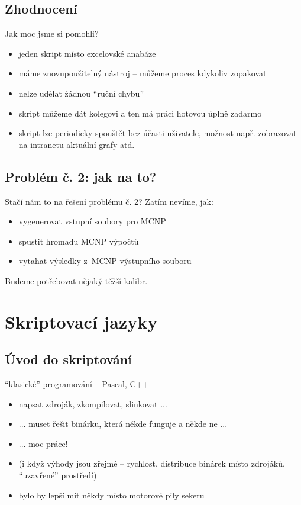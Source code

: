 \documentclass{beamer}
\begin{document}
\subsection{Zhodnocení}

\begin{frame}{Jak moc jsme si pomohli?}
  \begin{itemize}
    \item jeden skript místo excelovské anabáze
    \item máme znovupoužitelný nástroj -- můžeme proces kdykoliv zopakovat
    \item nelze udělat žádnou ``ruční chybu''
    \item skript můžeme dát kolegovi a ten má práci hotovou úplně zadarmo
    \item skript lze periodicky spouštět bez účasti uživatele, možnost např. zobrazovat na intranetu aktuální grafy atd.
  \end{itemize}
\end{frame}

\subsection{Problém č. 2: jak na to?}

\begin{frame}{Stačí nám to na řešení problému č. 2?}
  Zatím nevíme, jak:
  \begin{itemize}
    \item vygenerovat vstupní soubory pro MCNP
    \item spustit hromadu MCNP výpočtů
    \item vytahat výsledky z~MCNP výstupního souboru
  \end{itemize}
  Budeme potřebovat nějaký těžší kalibr.
\end{frame}

\section{Skriptovací jazyky}

\subsection{Úvod do skriptování}

\begin{frame}{``klasické'' programování -- Pascal, C++}
  \begin{itemize}
    \item napsat zdroják, zkompilovat, slinkovat ...
    \item ... muset řešit binárku, která někde funguje a někde ne ...
    \item ... moc práce!
    \item (i když výhody jsou zřejmé -- rychlost, distribuce binárek místo zdrojáků, ``uzavřené'' prostředí)
    \item bylo by lepší mít někdy místo motorové pily sekeru
  \end{itemize}
\end{frame}
\end{document}
